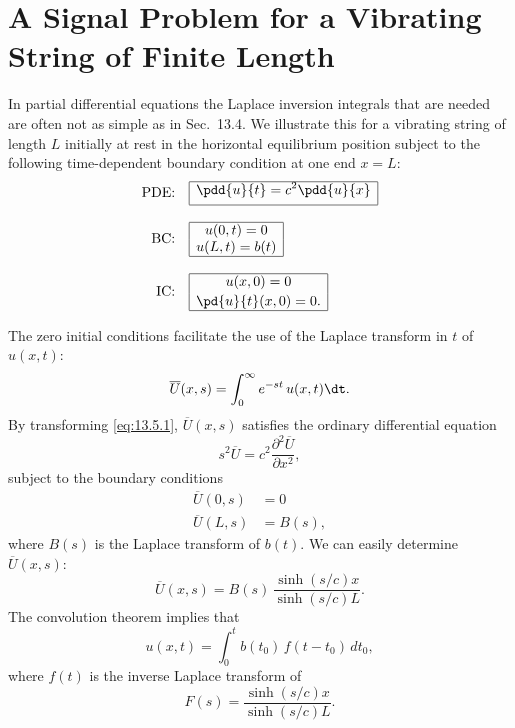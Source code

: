 \section{A Signal Problem for a Vibrating String of Finite Length}
\label{sec:13.5}

In partial differential equations the Laplace inversion integrals that are needed are often not as simple as in Sec.~13.4.  We illustrate this for a vibrating string of length $L$ initially at rest in the horizontal equilibrium position subject to the following time-dependent boundary condition at one end $x = L$:
\begin{align}
\text{PDE:}\quad &
\begin{array}{|c|}
\hline
\displaystyle\pdd{u}{t} = c^2\pdd{u}{x} \\[4pt]
\hline
\end{array}
\label{eq:13.5.1} \\[8pt]
\text{BC:}\quad &
\begin{array}{|c|}
\hline
u(0,t) = 0 \\
u(L,t) = b(t) \\
\hline
\end{array}
\label{eq:13.5.2} \\[8pt]
\text{IC:}\quad &
\begin{array}{|c|}
\hline
u(x,0) = 0 \\[2pt]
\displaystyle\pd{u}{t}(x,0) = 0. \\
\hline
\end{array}
\label{eq:13.5.3}
\end{align}

The zero initial conditions facilitate the use of the Laplace transform in $t$ of $u(x,t)$:
\begin{equation}
\overline{U}(x,s) = \int_0^{\infty} e^{-st}\,u(x,t)\dt.
\label{eq:13.5.4}
\end{equation}
By transforming \eqref{eq:13.5.1}, $\overline{U}(x,s)$ satisfies the ordinary differential equation
\begin{equation}
s^2\overline{U} = c^2\frac{\partial^2\overline{U}}{\partial x^2},
\label{eq:13.5.5}
\end{equation}
subject to the boundary conditions
\begin{align}
\overline{U}(0,s) &= 0 \label{eq:13.5.6}\\
\overline{U}(L,s) &= B(s), \label{eq:13.5.7}
\end{align}
where $B(s)$ is the Laplace transform of $b(t)$.  We can easily determine $\overline{U}(x,s)$:
\begin{equation}
\overline{U}(x,s) = B(s)\,\frac{\sinh(s/c)x}{\sinh(s/c)L}.
\label{eq:13.5.8}
\end{equation}
The convolution theorem implies that
\begin{equation}
u(x,t) = \int_0^t b(t_0)\,f(t-t_0)\,dt_0,
\label{eq:13.5.9}
\end{equation}
where $f(t)$ is the inverse Laplace transform of
\begin{equation}
F(s) = \frac{\sinh(s/c)x}{\sinh(s/c)L}.
\label{eq:13.5.10}
\end{equation}

